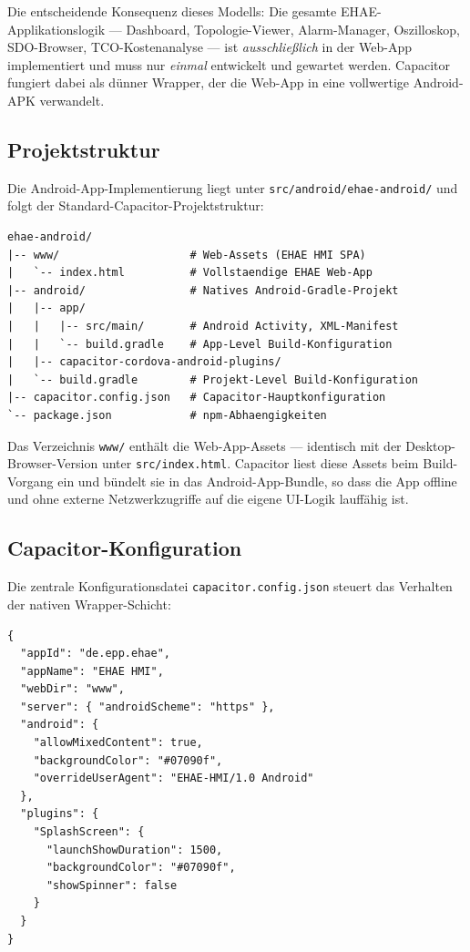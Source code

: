 ﻿\documentclass[12pt,a4paper]{article}
\begin{document}
Die entscheidende Konsequenz dieses Modells: Die gesamte EHAE-Applikationslogik
--- Dashboard, Topologie-Viewer, Alarm-Manager, Oszilloskop, SDO-Browser,
TCO-Kostenanalyse --- ist \emph{ausschlie\ss{}lich} in der Web-App implementiert
und muss nur \emph{einmal} entwickelt und gewartet werden. Capacitor fungiert dabei
als dünner Wrapper, der die Web-App in eine vollwertige Android-APK verwandelt.

\subsection{Projektstruktur}

Die Android-App-Implementierung liegt unter \texttt{src/android/ehae-android/} und
folgt der Standard-Capacitor-Projektstruktur:

\begin{lstlisting}[language={}, caption={Projektstruktur der EHAE-Android-App.}]
ehae-android/
|-- www/                    # Web-Assets (EHAE HMI SPA)
|   `-- index.html          # Vollstaendige EHAE Web-App
|-- android/                # Natives Android-Gradle-Projekt
|   |-- app/
|   |   |-- src/main/       # Android Activity, XML-Manifest
|   |   `-- build.gradle    # App-Level Build-Konfiguration
|   |-- capacitor-cordova-android-plugins/
|   `-- build.gradle        # Projekt-Level Build-Konfiguration
|-- capacitor.config.json   # Capacitor-Hauptkonfiguration
`-- package.json            # npm-Abhaengigkeiten
\end{lstlisting}

Das Verzeichnis \texttt{www/} enthält die Web-App-Assets --- identisch mit der
Desktop-Browser-Version unter \texttt{src/index.html}. Capacitor liest diese Assets
beim Build-Vorgang ein und bündelt sie in das Android-App-Bundle, so dass die App
offline und ohne externe Netzwerkzugriffe auf die eigene UI-Logik lauffähig ist.

\subsection{Capacitor-Konfiguration}

Die zentrale Konfigurationsdatei \texttt{capacitor.config.json} steuert das Verhalten
der nativen Wrapper-Schicht:

\begin{lstlisting}[language={}, caption={Capacitor-Konfiguration (\texttt{capacitor.config.json}).}]
{
  "appId": "de.epp.ehae",
  "appName": "EHAE HMI",
  "webDir": "www",
  "server": { "androidScheme": "https" },
  "android": {
    "allowMixedContent": true,
    "backgroundColor": "#07090f",
    "overrideUserAgent": "EHAE-HMI/1.0 Android"
  },
  "plugins": {
    "SplashScreen": {
      "launchShowDuration": 1500,
      "backgroundColor": "#07090f",
      "showSpinner": false
    }
  }
}
\end{lstlisting}
\end{document}
